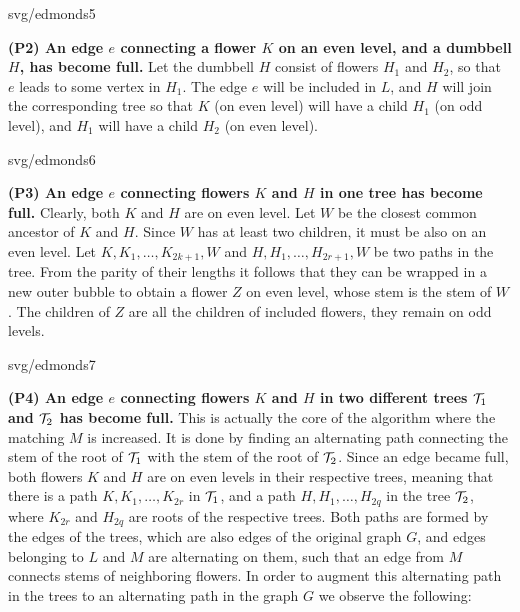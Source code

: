 \begin{myfig}{0.8\textwidth}{svg/edmonds5}
\end{myfig}

\vspace*{-4ex}
\noindent
{\bf (P2) An edge $e$ connecting a flower $K$ on an even level, and a dumbbell $H$, has become full.} 
Let the dumbbell $H$ consist of flowers $H_1$ and $H_2$, so that $e$ leads to some vertex in $H_1$. The
edge $e$ will be included in $L$, and $H$ will join the corresponding tree so that $K$ (on even level)
will have a child $H_1$ (on odd level), and $H_1$ will have a child $H_2$ (on even level).

\begin{myfig}{0.7\textwidth}{svg/edmonds6}
\end{myfig}

\vspace*{-4ex}
\noindent
{\bf (P3)  An edge $e$ connecting flowers $K$ and $H$ in one tree has become full.}
Clearly, both $K$ and $H$ are on even level. Let $W$ be the closest common ancestor of $K$ and $H$. Since $W$
has at least two children, it must be also on an even level. Let  $K,K_1,\ldots,K_{2k+1},W$ and
$H,H_1,\ldots,H_{2r+1},W$ be two paths in the tree. From the parity of their  lengths it follows that they
can be wrapped in a new outer bubble to obtain a flower $Z$ on even level, whose stem is the stem of $W$.
The children of $Z$ are all the children of included flowers, they remain on odd levels. 

\begin{myfig}{0.8\textwidth}{svg/edmonds7}
\end{myfig}

\vspace*{-4ex}
\noindent
{\bf (P4) An edge $e$ connecting flowers $K$ and $H$ in two different trees ${\cal T}_1$ and ${\cal T}_2$ 
has become full.}
This is actually the core of the algorithm where the matching $M$ is increased. It is done by finding 
an alternating path connecting the stem of the root of ${\cal T}_1$ with the stem of the root of 
${\cal T}_2$. Since an edge became full, both flowers $K$ and $H$ are on even levels in their respective trees,
meaning that there is a path $K,K_1,\ldots,K_{2r}$ in ${\cal T}_1$, and a path $H,H_1,\ldots,H_{2q}$ 
in the tree ${\cal T}_2$, where $K_{2r}$ and $H_{2q}$ are roots of the respective trees. 
Both paths are formed by the edges of the trees, which are also edges of the original graph $G$, and
edges belonging to $L$ and $M$ are alternating on them, such that an edge from $M$ connects 
stems of neighboring flowers. In order to augment this alternating path in the trees
to an alternating path in the graph $G$ we observe the following:

